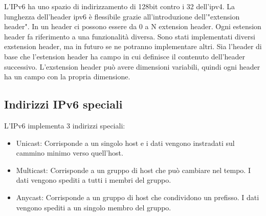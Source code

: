 \documentclass{article}
\begin{document}
    L'IPv6 ha uno spazio di indirizzamento di 128bit contro i 32 dell'ipv4.
    La lunghezza dell'header ipv6 è flessibile grazie all'introduzione dell'"extension header". In un header ci possono essere da 0 a N extension header.
    Ogni estension header fa riferimento a una funzionalità diversa.
    Sono stati implementati diversi exstension header, ma in futuro se ne potranno implementare altri.
    Sia l'header di base che l'estension header ha campo in cui definisce il contenuto dell'header successivo.
   L'exstension header può avere dimensioni variabili, quindi ogni header ha un campo con la propria dimensione. 
    
    \subsection*{Indirizzi IPv6 speciali}
    
    L'IPv6 implementa 3 indirizzi speciali:
    \begin{itemize}
        \item Unicast: Corrisponde a un singolo host e i dati vengono instradati sul cammino minimo verso quell'host.
        \item Multicast: Corrisponde a un gruppo di host che può cambiare nel tempo.
        I dati vengono spediti a tutti i membri del gruppo.
        \item Anycast: Corrisponde a un gruppo di host che condividono un prefisso.
        I dati vengono spediti a un singolo membro del gruppo.
    \end{itemize}
\end{document}
